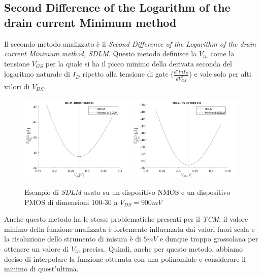\documentclass[12pt, letterpaper]{book}
\begin{document}
\subsection{Second Difference of the Logarithm of the drain current Minimum method}

Il secondo metodo analizzato è il \emph{Second Difference of the Logarithm of the drain current Minimum method, SDLM}. Questo metodo definisce la $V_{th}$ come la tensione $V_{GS}$ per la quale si ha il picco minimo della derivata seconda del logaritmo naturale di $I_D$ ripetto alla tensione di gate ($\frac{d^2lnI_D}{dV_{GS}^2}$) e vale solo per alti valori di $V_{DS}$. \\

\begin{figure}[h!]
\centering
 \includegraphics[width=0.49\textwidth]{SDLM-N4-100-30-NoFit}
 \includegraphics[width=0.49\textwidth]{SDLM-P1-100-30-NoFit}
 \caption{Esempio di \emph{SDLM} usato su un dispositivo NMOS e un dispositivo PMOS di dimensioni 100-30 a $V_{DS} = 900 mV$}
\end{figure}

Anche questo metodo ha le stesse problematiche presenti per il \emph{TCM}: il valore minimo della funzione analizzata è fortemente influenzata dai valori fuori scala e la risoluzione dello strumento di misura è di $5 mV$ e dunque troppo grossolana per ottenere un valore di $V_{th}$ precisa.
Quindi, anche per questo metodo, abbiamo deciso di interpolare la funzione ottenuta con una polinomiale e considerare il minimo di quest'ultima. \\
\end{document}
